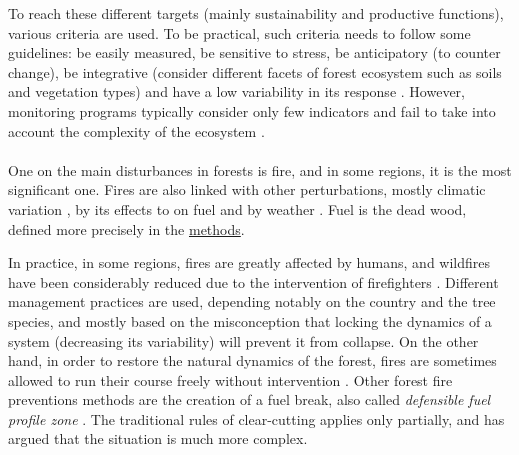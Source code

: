 \documentclass{article}
\begin{document}
To reach these different targets (mainly sustainability and productive functions), various criteria are used. To be practical, such criteria needs to follow some guidelines: be easily measured, be sensitive to stress, be anticipatory (to counter change), be integrative (consider different facets of forest ecosystem such as soils and vegetation types) and have a low variability in its response \citep{dale_challenges_2001}. However, monitoring programs typically consider only few indicators and fail to take into account the complexity of the ecosystem \citep{dale_challenges_2001}.

\paragraph{}

One on the main disturbances in forests is fire, and in some regions, it is the most significant one. %
Fires are also linked with other perturbations, mostly climatic variation \citep{mckenzie_climatic_2004, da2018dynamics}, by its effects to on fuel \citep{schoennagel_interaction_2004} and by weather \citep{fernandes_fire-smart_2013}. Fuel is the dead wood, defined more precisely in the \hyperref[fuel]{methods}.

In practice, in some regions, fires are greatly affected by humans, and wildfires have been considerably reduced due to the intervention of firefighters \citep{fernandes_fire-smart_2013}. Different management practices are used, depending notably on the country and the tree species, and mostly based on the misconception that locking the dynamics of a system (decreasing its variability) will prevent it from collapse. On the other hand, in order to restore the natural dynamics of the forest, fires are sometimes allowed to run their course freely without intervention \citep{wallenius2011major}. 
Other forest fire preventions methods are the creation of a fuel break, also called \textit{defensible fuel profile zone} \citep{omi_effectiveness_nodate, adams2013mega}. The traditional rules of clear-cutting applies only partially, and \cite{bergeron_natural_2001} has argued that the situation is much more complex.
\end{document}
